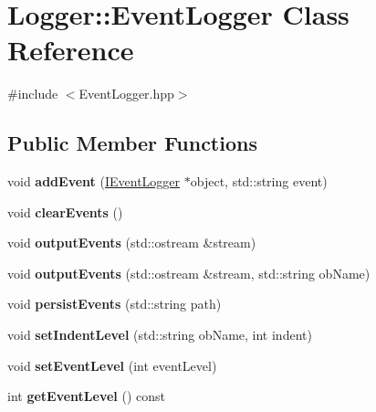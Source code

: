 \hypertarget{classLogger_1_1EventLogger}{
\section{Logger::EventLogger Class Reference}
\label{classLogger_1_1EventLogger}
}


{\ttfamily \#include $<$EventLogger.hpp$>$}

\subsection*{Public Member Functions}
\begin{DoxyCompactItemize}
\item 
\hypertarget{classLogger_1_1EventLogger_af7556a247349b831fc2286388651b519}{
void {\bfseries addEvent} (\hyperlink{classLogger_1_1IEventLogger}{IEventLogger} $\ast$object, std::string event)}
\label{classLogger_1_1EventLogger_af7556a247349b831fc2286388651b519}

\item 
\hypertarget{classLogger_1_1EventLogger_a4c3d63cf1b7ee732e440e92af220de7c}{
void {\bfseries clearEvents} ()}
\label{classLogger_1_1EventLogger_a4c3d63cf1b7ee732e440e92af220de7c}

\item 
\hypertarget{classLogger_1_1EventLogger_ad34b4fde8d58e32a0804a92f70b34413}{
void {\bfseries outputEvents} (std::ostream \&stream)}
\label{classLogger_1_1EventLogger_ad34b4fde8d58e32a0804a92f70b34413}

\item 
\hypertarget{classLogger_1_1EventLogger_a9d133349096938911223839726e6f29c}{
void {\bfseries outputEvents} (std::ostream \&stream, std::string obName)}
\label{classLogger_1_1EventLogger_a9d133349096938911223839726e6f29c}

\item 
\hypertarget{classLogger_1_1EventLogger_a18fc6a9cf8737c29942bca04449e89f3}{
void {\bfseries persistEvents} (std::string path)}
\label{classLogger_1_1EventLogger_a18fc6a9cf8737c29942bca04449e89f3}

\item 
\hypertarget{classLogger_1_1EventLogger_a2b255bd3a782d86c529e7b4891388a60}{
void {\bfseries setIndentLevel} (std::string obName, int indent)}
\label{classLogger_1_1EventLogger_a2b255bd3a782d86c529e7b4891388a60}

\item 
\hypertarget{classLogger_1_1EventLogger_ac30dc3b608680a6c60f183c49c541353}{
void {\bfseries setEventLevel} (int eventLevel)}
\label{classLogger_1_1EventLogger_ac30dc3b608680a6c60f183c49c541353}

\item 
\hypertarget{classLogger_1_1EventLogger_a80a0f5bacbb74f5bff8c3cc4b77ed568}{
int {\bfseries getEventLevel} () const }
\label{classLogger_1_1EventLogger_a80a0f5bacbb74f5bff8c3cc4b77ed568}

\end{DoxyCompactItemize}
